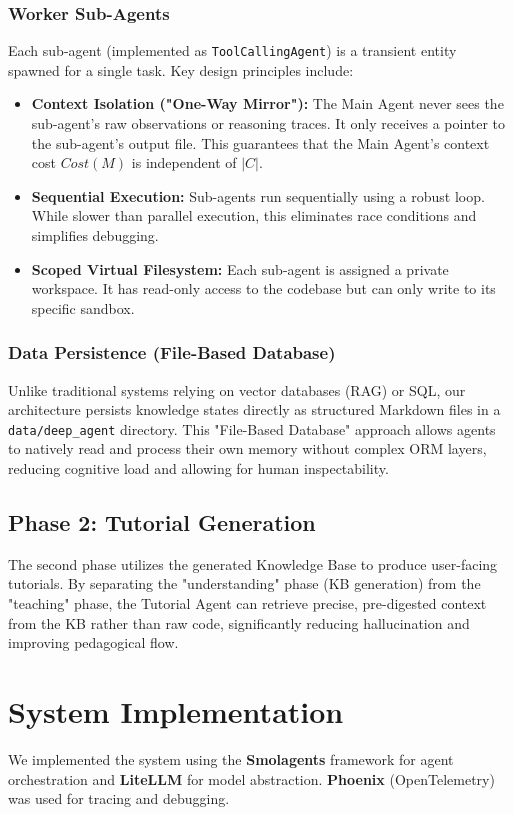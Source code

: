 \documentclass[conference]{IEEEtran}
\begin{document}
\subsubsection{Worker Sub-Agents}
Each sub-agent (implemented as \texttt{ToolCallingAgent}) is a transient entity spawned for a single task. Key design principles include:
\begin{itemize}
    \item \textbf{Context Isolation ("One-Way Mirror"):} The Main Agent never sees the sub-agent's raw observations or reasoning traces. It only receives a pointer to the sub-agent's output file. This guarantees that the Main Agent's context cost $Cost(M)$ is independent of $|C|$.
    \item \textbf{Sequential Execution:} Sub-agents run sequentially using a robust loop. While slower than parallel execution, this eliminates race conditions and simplifies debugging.
    \item \textbf{Scoped Virtual Filesystem:} Each sub-agent is assigned a private workspace. It has read-only access to the codebase but can only write to its specific sandbox.
\end{itemize}

\subsubsection{Data Persistence (File-Based Database)}
Unlike traditional systems relying on vector databases (RAG) or SQL, our architecture persists knowledge states directly as structured Markdown files in a \texttt{data/deep\_agent} directory. This "File-Based Database" approach allows agents to natively read and process their own memory without complex ORM layers, reducing cognitive load and allowing for human inspectability.

\subsection{Phase 2: Tutorial Generation}
The second phase utilizes the generated Knowledge Base to produce user-facing tutorials. By separating the "understanding" phase (KB generation) from the "teaching" phase, the Tutorial Agent can retrieve precise, pre-digested context from the KB rather than raw code, significantly reducing hallucination and improving pedagogical flow.

\section{System Implementation}
We implemented the system using the \textbf{Smolagents} framework for agent orchestration and \textbf{LiteLLM} for model abstraction. \textbf{Phoenix} (OpenTelemetry) was used for tracing and debugging.
\end{document}
